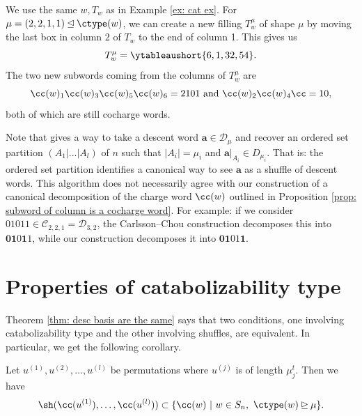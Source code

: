 \begin{ex}
We use the same $w, T_w$ as in Example \ref{ex: cat ex}.
For $\mu = (2,2,1,1) \unlhd \ctype(w)$, we can create a new filling $T_w^{\mu}$ of shape $\mu$ by moving the last box in column $2$ of $T_w$ to the end of column 1. This gives us \[T_w^{\mu} = \ytableaushort{6,1,32,54}.\] The two new subwords coming from the columns of $T_w^{\mu}$ are \[\cc(w)_1\cc(w)_3\cc(w)_5\cc(w)_6 = 2101 \text{ and } \cc(w)_2\cc(w)_4\cc = 10,\] both of which are still cocharge words. 
\end{ex}

\begin{rema}
    Note that \cite[Algorithm 1]{CC} gives a way to take a descent word $\mathbf{a}\in \mathcal{D}_\mu$ and recover an ordered set partition $(A_1|\dots|A_l)$ of $n$ such that $|A_i| = \mu_i$ and $\mathbf{a}\vert_{A_i}\in D_{\mu_i}$. That is: the ordered set partition identifies a canonical way to see $\mathbf{a}$ as a shuffle of descent words. This algorithm does not necessarily agree with our construction of a canonical decomposition of the charge word $\cc(w)$ outlined in Proposition \ref{prop: subword of column is a cocharge word}.
    For example: if we consider $01011\in \mathcal{C}_{2,2,1} = \mathcal{D}_{3,2}$, the Carlsson--Chou construction decomposes this into $\mathbf{01}0\mathbf{1}1$, while our construction decomposes it into $\mathbf{01}01\mathbf{1}$.
\end{rema}

\section{Properties of catabolizability type}\label{section:ctype sum}
Theorem \ref{thm: desc basis are the same} says that two conditions, one involving catabolizability type and the other involving shuffles, are equivalent. In particular, we get the following corollary.

\begin{coro}\label{cor: shuffles of cocharge words have correct ctype}
    Let $u^{(1)}, u^{(2)}, \dots, u^{(l)}$ be permutations where $u^{(j)}$ is of length $\mu_j^t$. Then we have \[\sh(\cc(u^{(1)}),\dots, \cc(u^{(l)})) \subset \{\cc(w) \ | \ w \in S_n, \ \ctype(w)\unrhd \mu\}.\]
\end{coro}

